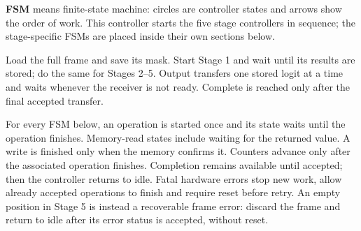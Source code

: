 \documentclass[11pt,a4paper]{article}
\begin{document}
\textbf{FSM} means finite-state machine: circles are controller states and arrows show the order of work. This controller starts the five stage controllers in sequence; the stage-specific FSMs are placed inside their own sections below.
\begin{center}
\end{center}
Load the full frame and save its mask. Start Stage 1 and wait until its results are stored; do the same for Stages 2--5. Output transfers one stored logit at a time and waits whenever the receiver is not ready. Complete is reached only after the final accepted transfer.

For every FSM below, an operation is started once and its state waits until the operation finishes. Memory-read states include waiting for the returned value. A write is finished only when the memory confirms it. Counters advance only after the associated operation finishes. Completion remains available until accepted; then the controller returns to idle. Fatal hardware errors stop new work, allow already accepted operations to finish and require reset before retry. An empty position in Stage 5 is instead a recoverable frame error: discard the frame and return to idle after its error status is accepted, without reset.
\end{document}
